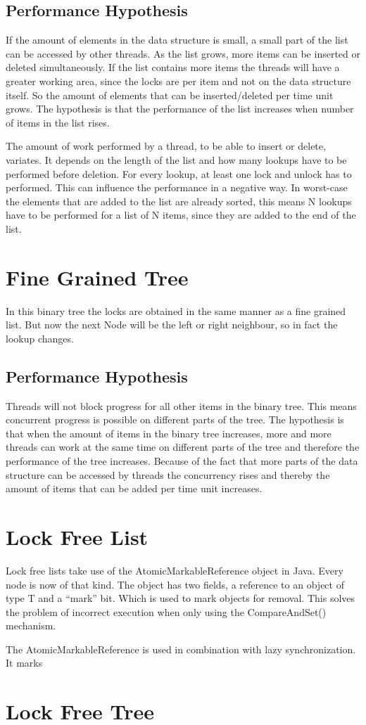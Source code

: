 \documentclass[10pt,a4paper]{article}
\begin{document}
\subsection{Performance Hypothesis} If the amount of elements in the data
structure is small, a small part of the list can be accessed by other threads.
As the list grows, more items can be inserted or deleted simultaneously. If the
list contains more items the threads will have a greater working area, since
the locks are per item and not on the data structure itself. So the amount of
elements that can be inserted/deleted per time unit grows.  The hypothesis is
that the performance of the list increases when number of items in the list
rises.

The amount of work performed by a thread, to be able to insert or delete,
variates. It depends on the length of the list and how many lookups have to be
performed before deletion. For every lookup, at least one lock and unlock has
to performed. This can influence the performance in a negative way. In
worst-case the elements that are added to the list are already sorted, this
means N lookups have to be performed for a list of N items, since they are
added to the end of the list.

\section{Fine Grained Tree} In this binary tree the locks are obtained in the
same manner as a fine grained list. But now the next Node will be the left or
right neighbour, so in fact the lookup changes. 

\subsection{Performance Hypothesis} Threads will not block progress for all
other items in the binary tree. This means concurrent progress is possible on
different parts of the tree.  The hypothesis is that when the amount of items
in the binary tree increases, more and more threads can work at the same time
on different parts of the tree and therefore the performance of the tree
increases.  Because of the fact that more parts of the data structure can be
accessed by threads the concurrency rises and thereby the amount of items that
can be added per time unit increases.


\section{Lock Free List}
Lock free lists take use of the AtomicMarkableReference object in Java. Every
node is now of that kind. The object has two fields, a reference to an object
of type T and a ``mark'' bit. Which is used to mark objects for removal. This
solves the problem of incorrect execution when only using the CompareAndSet()
mechanism. 

The AtomicMarkableReference is used in combination with lazy synchronization.
It marks

\section{Lock Free Tree}
\end{document}
